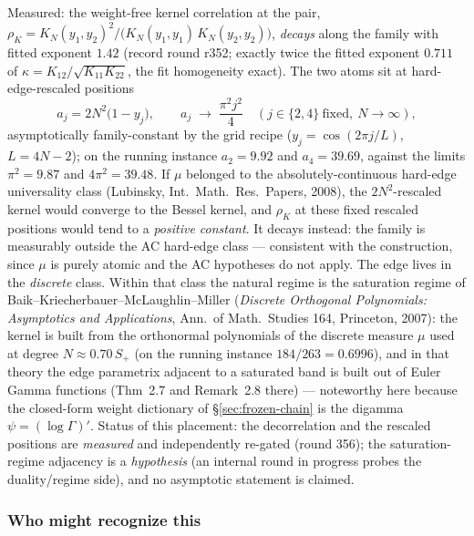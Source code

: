\documentclass[11pt]{article}
\theoremstyle{remark}
\begin{document}
Measured: the weight-free kernel correlation at the pair,
$\rho_{K}=K_{N}(y_{1},y_{2})^{2}/\bigl(K_{N}(y_{1},y_{1})\,
K_{N}(y_{2},y_{2})\bigr)$, \emph{decays} along the family with
fitted exponent $1.42$ (record round r352; exactly twice the
fitted exponent $0.711$ of
$\kappa=K_{12}/\sqrt{K_{11}K_{22}}$, the fit homogeneity
exact).  The two atoms sit at hard-edge-rescaled positions
\[
a_{j}=2N^{2}\bigl(1-y_{j}\bigr),
\qquad
a_{j}\;\longrightarrow\;\frac{\pi^{2}j^{2}}{4}
\quad(j\in\{2,4\}\ \text{fixed},\ N\to\infty),
\]
asymptotically family-constant by the grid recipe
($y_{j}=\cos(2\pi j/L)$, $L=4N-2$); on the running instance
$a_{2}=9.92$ and $a_{4}=39.69$, against the limits
$\pi^{2}=9.87$ and $4\pi^{2}=39.48$.  If $\mu$ belonged to the
absolutely-continuous hard-edge universality class (Lubinsky,
Int.\ Math.\ Res.\ Papers, 2008), the $2N^{2}$-rescaled kernel
would converge to the Bessel kernel, and $\rho_{K}$ at these
fixed rescaled positions would tend to a \emph{positive
constant}.  It decays instead: the family is measurably outside
the AC hard-edge class --- consistent with the construction,
since $\mu$ is purely atomic and the AC hypotheses do not apply.
The edge lives in the \emph{discrete} class.  Within that class
the natural regime is the saturation regime of
Baik--Kriecherbauer--McLaughlin--Miller (\emph{Discrete
Orthogonal Polynomials: Asymptotics and Applications}, Ann.\ of
Math.\ Studies 164, Princeton, 2007): the kernel is built from
the orthonormal polynomials of the discrete measure $\mu$ used
at degree $N\approx0.70\,S_{+}$ (on the running instance
$184/263=0.6996$), and in that theory the edge parametrix
adjacent to a saturated band is built out of Euler Gamma
functions (Thm~2.7 and Remark~2.8 there) --- noteworthy here
because the closed-form weight dictionary of
\S\ref{sec:frozen-chain} is the digamma $\psi=(\log\Gamma)'$.
Status of this placement: the decorrelation and the rescaled
positions are \emph{measured} and independently re-gated
(round 356); the saturation-regime adjacency
is a \emph{hypothesis} (an internal round in progress probes the
duality/regime side), and no asymptotic statement is claimed.

\subsubsection*{Who might recognize this}
\end{document}
